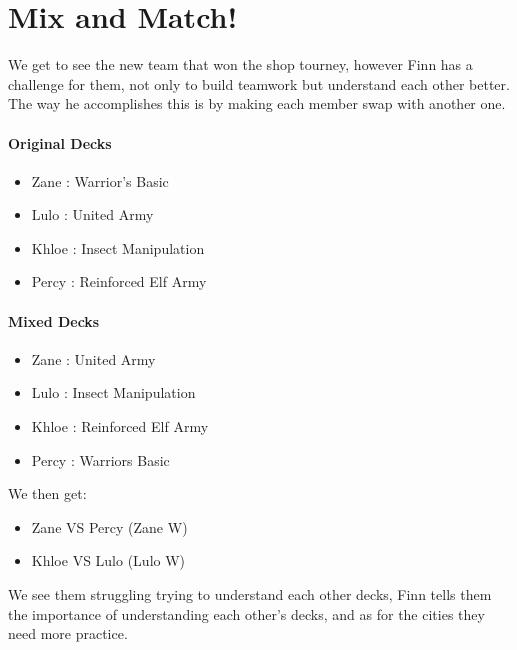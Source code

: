 \section{Mix and Match!}
\par We get to see the new team that won the shop tourney, however Finn has a challenge for them, 
not only to build teamwork but understand each other better. The way he accomplishes this is by 
making each member swap with another one.

\paragraph{Original Decks}
\begin{itemize}
   \item Zane : Warrior’s Basic
   \item Lulo : United Army
   \item Khloe : Insect Manipulation
   \item Percy : Reinforced Elf Army
\end{itemize}
\paragraph{Mixed Decks}
\begin{itemize}
   \item Zane : United Army
   \item Lulo : Insect Manipulation
   \item Khloe : Reinforced Elf Army
   \item Percy : Warriors Basic
\end{itemize}
\par We then get:
\begin{itemize}
   \item Zane VS Percy (Zane W)
   \item Khloe VS Lulo (Lulo W)
\end{itemize}
\par We see them struggling trying to understand each other decks, Finn tells them the importance of 
understanding each other’s decks, and as for the cities they need more practice.